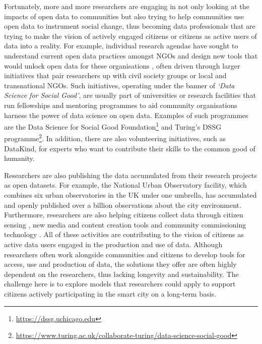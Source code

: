 Fortunately, more and more researchers are engaging in not only looking at the impacts of open data to communities but also trying to help communities use open data to instrument social change, thus becoming data professionals that are trying to make the vision of actively engaged citizens or citizens as active users of data into a reality. For example, individual research agendas have sought to understand current open data practices amongst NGOs and design new tools that would unlock open data for these organisations \citep{erete_storytelling_2016,marshall_accountable:_2016}, often driven through larger initiatives that pair researchers up with civil society groups or local and transnational NGOs. Such initiatives, operating under the banner of \textit{`Data Science for Social Good'}, are usually part of universities or research facilities that run fellowships and mentoring programmes to aid community organisations harness the power of data science on open data. Examples of such programmes are the Data Science for Social Good Foundation\footnote{\url{https://dssg.uchicago.edu}} and Turing's DSSG programme\footnote{\url{https://www.turing.ac.uk/collaborate-turing/data-science-social-good}}. In addition, there are also volunteering initiatives, such as DataKind, for experts who want to contribute their skills to the common good of humanity.

Researchers are also publishing the data accumulated from their research projects as open datasets. For example, the National Urban Observatory facility, which combines six urban observatories in the UK under one umbrella, has accumulated and openly published over a billion observations about the city environment. Furthermore, researchers are also helping citizens collect data through citizen sensing \citep{balestrini_beyond_2014}, new media and content creation tools \citep{taylor_creating_2010,schofield_bootlegger_2015,crivellaro_re-making_2016,bartindale_our_2019} and community commissioning technology \citep{garbett_app_2016}. All of these activities are contributing to the vision of citizens as active data users engaged in the production and use of data. Although researchers often work alongside communities and citizens to develop tools for access, use and production of data, the solutions they offer are often highly dependent on the researchers, thus lacking longevity and sustainability. The challenge here is to explore models that researchers could apply to support citizens actively participating in the smart city on a long-term basis.

